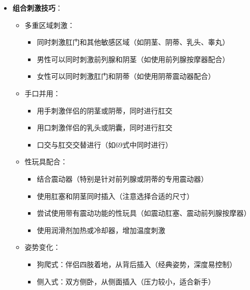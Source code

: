 \documentclass[12pt,UTF8]{ctexbook}
\begin{document}
\begin{itemize}
\begin{itemize}
\begin{itemize}
			\item 根据伴侣的偏好和舒适度调整深度
		\end{itemize}
		\item 节奏与角度：
		\begin{itemize}
			\item 使用不同的节奏进行抽送（慢节奏、快节奏、停顿-开始节奏）
			\item 调整插入的角度，找到最舒适和最刺激的角度
			\item 尝试旋转插入物，增加对直肠壁的刺激
			\item 可以结合"8"字形或圆周运动，增加刺激的多样性
		\end{itemize}
	\end{itemize}
	\item \textbf{组合刺激技巧}：
	\begin{itemize}
		\item 多重区域刺激：
		\begin{itemize}
			\item 同时刺激肛门和其他敏感区域（如阴茎、阴蒂、乳头、睾丸）
			\item 男性可以同时刺激前列腺和阴茎（如使用前列腺按摩器配合）
			\item 女性可以同时刺激肛门和阴蒂（如使用阴蒂震动器配合）
		\end{itemize}
		\item 手口并用：
		\begin{itemize}
			\item 用手刺激伴侣的阴茎或阴蒂，同时进行肛交
			\item 用口刺激伴侣的乳头或阴囊，同时进行肛交
			\item 口交与肛交交替进行（如69式中同时进行）
		\end{itemize}
		\item 性玩具配合：
		\begin{itemize}
			\item 结合震动器（特别是针对前列腺或阴蒂的专用震动器）
			\item 使用肛塞和阴茎同时插入（注意选择合适的尺寸）
			\item 尝试使用带有震动功能的性玩具（如震动肛塞、震动前列腺按摩器）
			\item 使用润滑剂加热或冷却器，增加温度刺激
		\end{itemize}
		\item 姿势变化：
		\begin{itemize}
			\item 狗爬式：伴侣四肢着地，从背后插入（经典姿势，深度易控制）
			\item 侧入式：双方侧卧，从侧面插入（压力较小，适合新手）

\end{itemize}
\end{itemize}
\end{itemize}
\end{document}
